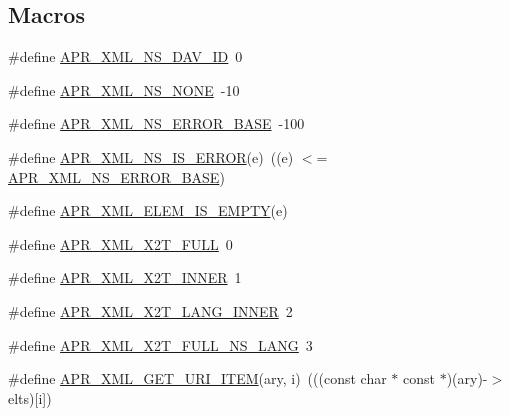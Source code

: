 \subsection*{Macros}
\begin{DoxyCompactItemize}
\item 
\#define \hyperlink{group___a_p_r___util___x_m_l_gad856851edabebf42e4150597c6f9d2c2}{A\-P\-R\-\_\-\-X\-M\-L\-\_\-\-N\-S\-\_\-\-D\-A\-V\-\_\-\-I\-D}~0
\item 
\#define \hyperlink{group___a_p_r___util___x_m_l_ga2eed42f7f5e2b1932141f6bb5594b042}{A\-P\-R\-\_\-\-X\-M\-L\-\_\-\-N\-S\-\_\-\-N\-O\-N\-E}~-\/10
\item 
\#define \hyperlink{group___a_p_r___util___x_m_l_ga949c1a93de86c67576a0f2f225208447}{A\-P\-R\-\_\-\-X\-M\-L\-\_\-\-N\-S\-\_\-\-E\-R\-R\-O\-R\-\_\-\-B\-A\-S\-E}~-\/100
\item 
\#define \hyperlink{group___a_p_r___util___x_m_l_ga65029fb8740ec9eb85562df1300d125f}{A\-P\-R\-\_\-\-X\-M\-L\-\_\-\-N\-S\-\_\-\-I\-S\-\_\-\-E\-R\-R\-O\-R}(e)~((e) $<$= \hyperlink{group___a_p_r___util___x_m_l_ga949c1a93de86c67576a0f2f225208447}{A\-P\-R\-\_\-\-X\-M\-L\-\_\-\-N\-S\-\_\-\-E\-R\-R\-O\-R\-\_\-\-B\-A\-S\-E})
\item 
\#define \hyperlink{group___a_p_r___util___x_m_l_gaa5792e7a2aa38dc98a93b0762c98441f}{A\-P\-R\-\_\-\-X\-M\-L\-\_\-\-E\-L\-E\-M\-\_\-\-I\-S\-\_\-\-E\-M\-P\-T\-Y}(e)
\item 
\#define \hyperlink{group___a_p_r___util___x_m_l_gaeb48abf8de020df9bad57cfc7ca35747}{A\-P\-R\-\_\-\-X\-M\-L\-\_\-\-X2\-T\-\_\-\-F\-U\-L\-L}~0
\item 
\#define \hyperlink{group___a_p_r___util___x_m_l_ga715a5e536efbfa24854531008cf4bdce}{A\-P\-R\-\_\-\-X\-M\-L\-\_\-\-X2\-T\-\_\-\-I\-N\-N\-E\-R}~1
\item 
\#define \hyperlink{group___a_p_r___util___x_m_l_ga4cd40106902732169b8fe7579ba2e67c}{A\-P\-R\-\_\-\-X\-M\-L\-\_\-\-X2\-T\-\_\-\-L\-A\-N\-G\-\_\-\-I\-N\-N\-E\-R}~2
\item 
\#define \hyperlink{group___a_p_r___util___x_m_l_ga7b2cd4c48940cd95a56ace294a94d938}{A\-P\-R\-\_\-\-X\-M\-L\-\_\-\-X2\-T\-\_\-\-F\-U\-L\-L\-\_\-\-N\-S\-\_\-\-L\-A\-N\-G}~3
\item 
\#define \hyperlink{group___a_p_r___util___x_m_l_gaf31ae94be9e1db1ee0175f7c0c40e3a7}{A\-P\-R\-\_\-\-X\-M\-L\-\_\-\-G\-E\-T\-\_\-\-U\-R\-I\-\_\-\-I\-T\-E\-M}(ary, i)~(((const char $\ast$ const $\ast$)(ary)-\/$>$elts)\mbox{[}i\mbox{]})
\end{DoxyCompactItemize}
